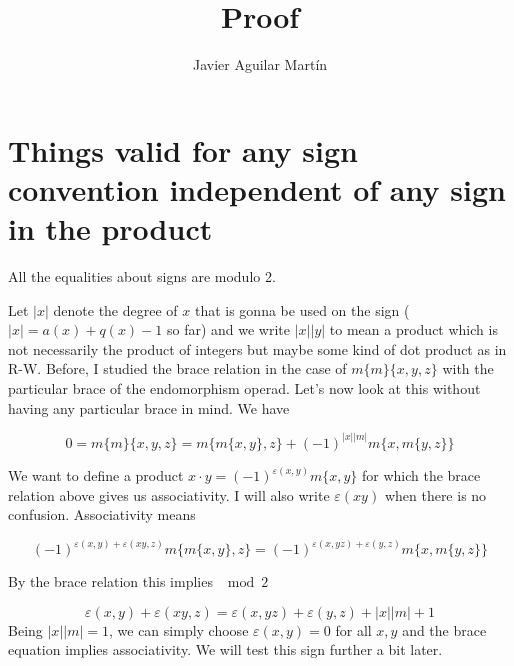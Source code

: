 \documentclass[twoside]{article}
\begin{document}
\title{Proof}
\author{Javier Aguilar Martín}
\maketitle

\section{Things valid for any sign convention independent of any sign in the product}


All the equalities about signs are modulo 2.

Let $|x|$ denote the degree of $x$ that is gonna be used on the sign ($|x|=a(x)+q(x)-1$ so far) and we write $|x||y|$ to mean a product which is not necessarily the product of integers but maybe some kind of dot product as in R-W. Before, I studied the brace relation in the case of $m\{m\}\{x,y,z\}$ with the particular brace of the endomorphism operad. Let's now look at this without having any particular brace in mind. We have

$$0=m\{m\}\{x,y,z\}=m\{m\{x,y\},z\}+(-1)^{|x||m|}m\{x,m\{y,z\}\}$$

We want to define a product $x\cdot y=(-1)^{\varepsilon(x,y)}m\{x,y\}$ for which the brace relation above gives us associativity. I will also write $\varepsilon(xy)$ when there is no confusion. Associativity means

$$(-1)^{\varepsilon(x,y)+\varepsilon(xy,z)}m\{m\{x,y\},z\}=(-1)^{\varepsilon(x,yz)+\varepsilon(y,z)}m\{x,m\{y,z\}\}$$

By the brace relation this implies $\mod 2$ 

\begin{equation}\label{ass-sing}%
\varepsilon(x,y)+\varepsilon(xy,z)=\varepsilon(x,yz)+\varepsilon(y,z)+|x||m|+1
\end{equation}
%
%
Being $|x||m|=1$, we can simply choose $\varepsilon(x,y)=0$ for all $x,y$ and the brace equation implies associativity. We will test this sign further a bit later. 
\end{document}
